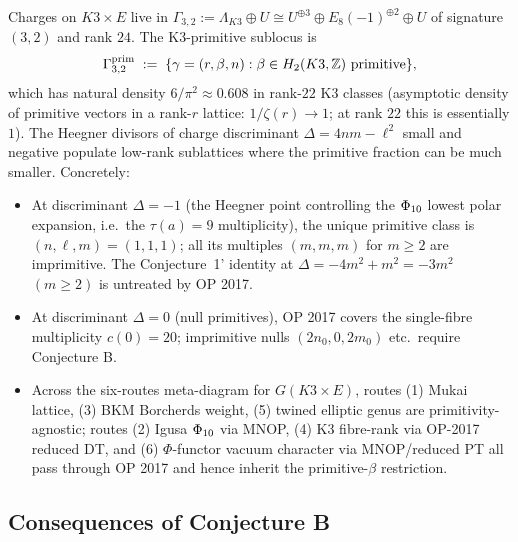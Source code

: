 Charges on $K3\times E$ live in $\Gamma_{3,2} := \Lambda_{K3}\oplus U
\cong U^{\oplus 3}\oplus E_8(-1)^{\oplus 2}\oplus U$ of signature
$(3,2)$ and rank $24$.  The K3-primitive sublocus is
\[
  \Gamma_{3,2}^{\mathrm{prim}}
  \;:=\; \{\gamma = (r,\beta,n) : \beta \in H_2(K3,\mathbb{Z})\
  \text{primitive}\},
\]
which has natural density $6/\pi^2 \approx 0.608$ in rank-$22$ K3
classes (asymptotic density of primitive vectors in a rank-$r$
lattice: $1/\zeta(r) \to 1$; at rank $22$ this is essentially $1$).
The Heegner divisors of charge
discriminant $\Delta = 4nm - \ell^2$ small and negative populate
low-rank sublattices where the primitive fraction can be much smaller.
Concretely:
\begin{itemize}
\item At discriminant $\Delta = -1$ (the Heegner point controlling
the $\Phi_{10}$ lowest polar expansion, i.e.\ the $\tau(a) = 9$
multiplicity), the unique primitive class is $(n,\ell,m) = (1,1,1)$;
all its multiples $(m,m,m)$ for $m \ge 2$ are imprimitive.  The
Conjecture~1' identity at $\Delta = -4m^2 + m^2 = -3m^2$ $(m\ge 2)$
is untreated by OP 2017.
\item At discriminant $\Delta = 0$ (null primitives), OP 2017 covers
the single-fibre multiplicity $c(0) = 20$; imprimitive nulls
$(2n_0,0,2m_0)$ etc.\ require Conjecture B.
\item Across the six-routes meta-diagram for $G(K3\times E)$, routes
(1) Mukai lattice, (3) BKM Borcherds weight, (5) twined elliptic
genus are primitivity-agnostic; routes (2) Igusa $\Phi_{10}$ via MNOP,
(4) K3 fibre-rank via OP-2017 reduced DT, and (6) $\Phi$-functor
vacuum character via MNOP/reduced PT all pass through OP 2017 and
hence inherit the primitive-$\beta$ restriction.
\end{itemize}

\subsection*{Consequences of Conjecture B}

